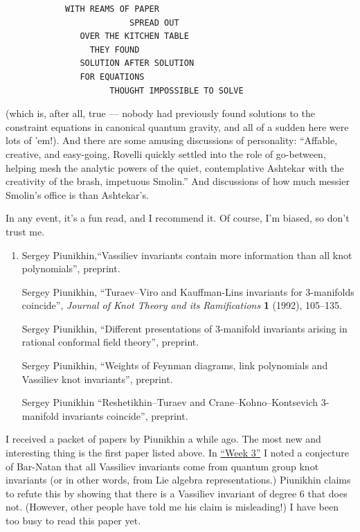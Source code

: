 \documentclass{article}
\begin{document}
\begin{verbatim}
            WITH REAMS OF PAPER
                         SPREAD OUT
               OVER THE KITCHEN TABLE
                 THEY FOUND
               SOLUTION AFTER SOLUTION
               FOR EQUATIONS
                     THOUGHT IMPOSSIBLE TO SOLVE
\end{verbatim}
(which is, after all, true --- nobody had previously found solutions to
the constraint equations in canonical quantum gravity, and all of a
sudden here were lots of 'em!). And there are some amusing discussions
of personality: ``Affable, creative, and easy-going, Rovelli quickly
settled into the role of go-between, helping mesh the analytic powers of
the quiet, contemplative Ashtekar with the creativity of the brash,
impetuous Smolin.'' And discussions of how much messier Smolin's office
is than Ashtekar's.

In any event, it's a fun read, and I recommend it. Of course, I'm
biased, so don't trust me.

\begin{enumerate}
\def\labelenumi{\arabic{enumi})}
\setcounter{enumi}{1}
\item
   Sergey Piunikhin,``Vassiliev invariants contain more information than all knot
  polynomials'', preprint. 

  Sergey Piunikhin, ``Turaev--Viro and Kauffman-Lins invariants for 3-manifolds coincide'',
  \emph{Journal of Knot Theory and its
  Ramifications} \textbf{1} (1992), 105--135.

  Sergey Piunikhin, ``Different presentations of 3-manifold invariants arising in rational
  conformal field theory'', preprint.

   Sergey Piunikhin, ``Weights of Feynman diagrams, link polynomials and Vassiliev knot
  invariants'', preprint.

  Sergey Piunikhin ``Reshetikhin--Turaev and Crane--Kohno--Kontsevich 3-manifold invariants
  coincide'', preprint.
\end{enumerate}

I received a packet of papers by Piunikhin a while ago. The most new and
interesting thing is the first paper listed above. In
\protect\hyperlink{week3}{``Week 3''} I noted a conjecture of Bar-Natan
that all Vassiliev invariants come from quantum group knot invariants
(or in other words, from Lie algebra representations.) Piunikhin claims
to refute this by showing that there is a Vassiliev invariant of degree
6 that does not. (However, other people have told me his claim is
misleading!) I have been too busy to read this paper yet.
\end{document}
